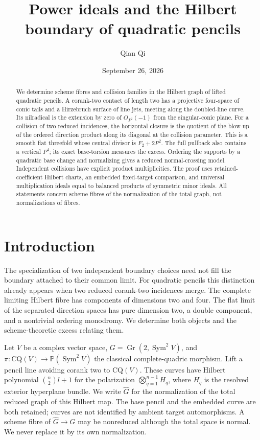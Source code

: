 \documentclass[11pt,reqno]{amsart}
\numberwithin{equation}{section}
\theoremstyle{definition}\newtheorem{definition}[theorem]{Definition}
\theoremstyle{remark}\newtheorem{remark}[theorem]{Remark}
\newcommand{\Pj}{\mathbb P}\newcommand{\A}{\mathbb A}
\DeclareMathOperator{\Sym}{Sym}\DeclareMathOperator{\Gr}{Gr}
\begin{document}
\title{Power ideals and the Hilbert boundary of quadratic pencils}
\author{Qian Qi}
\date{September 26, 2026}
\begin{abstract}
We determine scheme fibres and collision families in the Hilbert
graph of lifted quadratic pencils. A corank-two contact of length
two has a projective four-space of conic tails and a Hirzebruch
surface of line jets, meeting along the doubled-line curve. Its
nilradical is the extension by zero of $O_{P^2}(-1)$ from the
singular-conic plane. For a collision of two reduced incidences,
the horizontal closure is the quotient of the blow-up of the
ordered direction product along its diagonal at the collision
parameter. This is a smooth flat threefold whose central divisor
is $F_2+2P^2$. The full pullback also contains a vertical $P^4$;
its exact base-torsion measures the excess. Ordering the supports
by a quadratic base change and normalizing gives a reduced
normal-crossing model. Independent collisions have explicit
product multiplicities. The proof uses retained-coefficient
Hilbert charts, an embedded fixed-target comparison, and universal
multiplication ideals equal to balanced products of symmetric
minor ideals. All statements concern scheme fibres of the
normalization of the total graph, not normalizations of fibres.
\end{abstract}
\maketitle
\section{Introduction}
\label{sec:paper-ii-v164}
The specialization of two independent boundary choices need not
fill the boundary attached to their common limit. For quadratic
pencils this distinction already appears when two reduced
corank-two incidences merge. The complete limiting Hilbert fibre
has components of dimensions two and four. The flat limit of the
separated direction spaces has pure dimension two, a double
component, and a nontrivial ordering monodromy. We determine both
objects and the scheme-theoretic excess relating them.

Let $V$ be a complex vector space, $G=\Gr(2,\Sym^2V)$, and
$\pi:\mathrm{CQ}(V)\to\Pj(\Sym^2V)$ the classical complete-quadric
morphism. Lift a pencil line avoiding corank two to $\mathrm{CQ}(V)$.
These curves have Hilbert polynomial $\binom n2l+1$ for the
polarization $\bigotimes_{q=1}^{n-1}H_q$, where $H_q$ is the resolved
exterior hyperplane bundle. We write $\widehat G$ for the
normalization of the total reduced graph of this Hilbert map.
The base pencil and the embedded curve are both retained; curves
are not identified by ambient target automorphisms. A scheme fibre
of $\widehat G\to G$ may be nonreduced although the total space is
normal. We never replace it by its own normalization.
\end{document}
